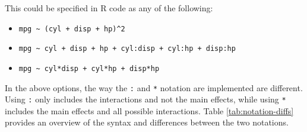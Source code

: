 \documentclass[
]{krantz}
\providecommand{\tightlist}{%
  \setlength{\itemsep}{0pt}\setlength{\parskip}{0pt}}
\begin{document}
This could be specified in R code as any of the following:

\begin{itemize}
\tightlist
\item
  \texttt{mpg\ \textasciitilde{}\ (cyl\ +\ disp\ +\ hp)\^{}2}
\item
  \texttt{mpg\ \textasciitilde{}\ cyl\ +\ disp\ +\ hp\ +\ cyl:disp\ +\ cyl:hp\ +\ disp:hp}
\item
  \texttt{mpg\ \textasciitilde{}\ cyl*disp\ +\ cyl*hp\ +\ disp*hp}
\end{itemize}

In the above options, the way the \texttt{:} and \texttt{*} notation are implemented are different. Using \texttt{:} only includes the interactions and not the main effects, while using \texttt{*} includes the main effects and all possible interactions. Table \ref{tab:notation-diffs} provides an overview of the syntax and differences between the two notations.
\end{document}
